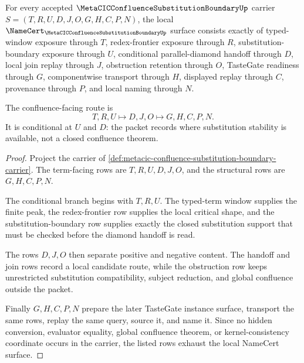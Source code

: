 \begin{theorem}
\label{thm:metacic-confluence-substitution-boundary-obligations}
For every accepted $\MetaCICConfluenceSubstitutionBoundaryUp$ carrier $S=(T,R,U,D,J,O,G,H,C,P,N)$, the local $\NameCert_{\MetaCICConfluenceSubstitutionBoundaryUp}$ surface consists exactly of typed-window exposure through $T$, redex-frontier exposure through $R$, substitution-boundary exposure through $U$, conditional parallel-diamond handoff through $D$, local join replay through $J$, obstruction retention through $O$, TasteGate readiness through $G$, componentwise transport through $H$, displayed replay through $C$, provenance through $P$, and local naming through $N$.

The confluence-facing route is
$$
T,R,U \longmapsto D,J,O \longmapsto G,H,C,P,N .
$$
It is conditional at $U$ and $D$: the packet records where substitution stability is available, not a closed confluence theorem.
\end{theorem}
\begin{proof}
Project the carrier of \autoref{def:metacic-confluence-substitution-boundary-carrier}. The term-facing rows are $T,R,U,D,J,O$, and the structural rows are $G,H,C,P,N$.

The conditional branch begins with $T,R,U$. The typed-term window supplies the finite peak, the redex-frontier row supplies the local critical shape, and the substitution-boundary row supplies exactly the closed substitution support that must be checked before the diamond handoff is read.

The rows $D,J,O$ then separate positive and negative content. The handoff and join rows record a local candidate route, while the obstruction row keeps unrestricted substitution compatibility, subject reduction, and global confluence outside the packet.

Finally $G,H,C,P,N$ prepare the later TasteGate instance surface, transport the same rows, replay the same query, source it, and name it. Since no hidden conversion, evaluator equality, global confluence theorem, or kernel-consistency coordinate occurs in the carrier, the listed rows exhaust the local NameCert surface.
\end{proof}

